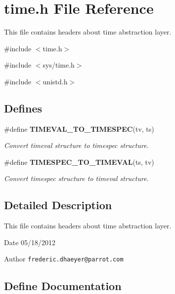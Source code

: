 \section{time.h File Reference}
\label{time_8h}


This file contains headers about time abstraction layer.  


{\ttfamily \#include $<$time.h$>$}\par
{\ttfamily \#include $<$sys/time.h$>$}\par
{\ttfamily \#include $<$unistd.h$>$}\par
\subsection*{Defines}
\begin{DoxyCompactItemize}
\item 
\#define {\bf TIMEVAL\_\-TO\_\-TIMESPEC}(tv, ts)
\begin{DoxyCompactList}\small\item\em Convert timeval structure to timespec structure. \item\end{DoxyCompactList}\item 
\#define {\bf TIMESPEC\_\-TO\_\-TIMEVAL}(ts, tv)
\begin{DoxyCompactList}\small\item\em Convert timespec structure to timeval structure. \item\end{DoxyCompactList}\end{DoxyCompactItemize}


\subsection{Detailed Description}
This file contains headers about time abstraction layer. \begin{DoxyDate}{Date}
05/18/2012 
\end{DoxyDate}
\begin{DoxyAuthor}{Author}
{\tt frederic.dhaeyer@parrot.com} 
\end{DoxyAuthor}


\subsection{Define Documentation}

